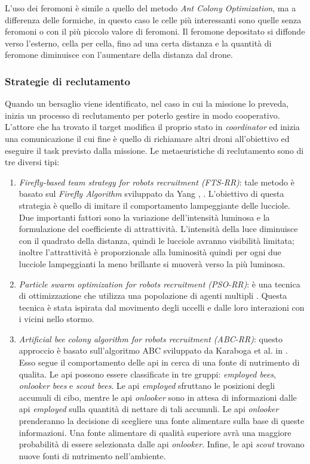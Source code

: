 L'uso dei feromoni è simile a quello del metodo \textit{Ant Colony Optimization}, ma a differenza delle formiche, in questo caso le celle più interessanti sono quelle senza feromoni o con il più piccolo valore di feromoni. 
Il feromone depositato si diffonde verso l'esterno, cella per cella, fino ad una certa distanza  e la quantità di feromone diminuisce con l'aumentare della distanza dal drone.


\subsubsection{Strategie di reclutamento}

Quando un bersaglio viene identificato, nel caso in cui la missione lo preveda, inizia un processo di reclutamento per poterlo gestire in modo cooperativo.
L'attore che ha trovato il target modifica il proprio stato in \textit{coordinator} ed inizia una comunicazione il cui fine è quello di richiamare altri droni all'obiettivo ed eseguire il task previsto dalla missione. 
Le metaeuristiche di reclutamento sono di tre diversi tipi:

\begin{enumerate}
    \item \textit{Firefly-based team strategy for robots recruitment (FTS-RR)}: tale metodo è basato sul \textit{Firefly Algorithm} sviluppato da Yang \cite{yang2009firefly}, \cite{yang2010firefly}. 
    L'obiettivo di questa strategia è quello di imitare il comportamento lampeggiante delle lucciole.
    Due importanti fattori sono la variazione dell’intensità luminosa e la formulazione del coefficiente di attrattività. 
    L’intensità della luce diminuisce con il quadrato della distanza, quindi le lucciole avranno visibilità limitata; inoltre l’attrattività è proporzionale alla luminosità quindi per ogni due lucciole lampeggianti la meno brillante si muoverà verso la più luminosa.
    \item \textit{Particle swarm optimization  for robots recruitment (PSO-RR)}: è una tecnica di ottimizzazione che utilizza una popolazione di agenti multipli \cite{eberhart1995particle}.
    Questa tecnica è stata ispirata dal movimento degli uccelli e dalle loro interazioni con i vicini nello stormo.
    \item \textit{Artificial bee colony algorithm  for robots recruitment (ABC-RR)}: questo approccio è basato sull'algoritmo ABC sviluppato da Karaboga et al. in \cite{karaboga2009comparative}.
    Esso segue il comportamento delle api in cerca di una fonte di nutrimento di qualita. Le api possono essere classificate in tre gruppi: \textit{employed bees}, \textit{onlooker bees} e \textit{scout bees}. 
    Le api \textit{employed} sfruttano le posizioni degli accumuli di cibo, mentre le api \textit{onlooker} sono in attesa di informazioni dalle api \textit{employed} sulla quantità di nettare di tali accumuli. 
    Le api \textit{onlooker} prenderanno la decisione di scegliere una fonte alimentare sulla base di queste informazioni.
    Una fonte alimentare di qualità superiore avrà una maggiore probabilità di essere selezionata dalle api \textit{onlooker}. Infine, le api \textit{scout} trovano nuove fonti di nutrimento nell'ambiente.
\end{enumerate}